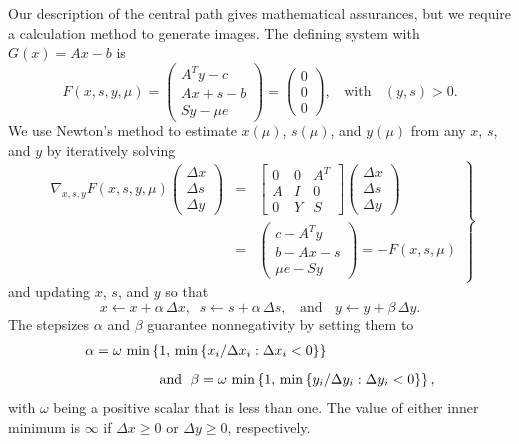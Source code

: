 \documentclass{article}
\begin{document}
Our description of the central path gives mathematical assurances, but 
we require a calculation method to generate images. 
The defining system with $G(x) = Ax - b$ is
\[
F(x,s,y,\mu) = \left(
        \begin{array}{c} 
            \displaystyle A^Ty - c \\[6pt]
            \displaystyle Ax + s - b \\[6pt]
            Sy - \mu e
        \end{array}
        \right)
    = \left( \begin{array}{c} 0 \\[6pt] 0 \\[6pt] 0 \end{array} \right),
\;\; \mbox{ with } \;\; (y,s) > 0.
\]
We use Newton's method to estimate $x(\mu)$, $s(\mu)$, and $y(\mu)$ 
from any $x$, $s$, and $y$ by iteratively solving
\begin{equation} \label{eq-stepSys}
\left.
\begin{array}{rcl}
\nabla_{x,s,y} F(x,s,y,\mu) 
    \left( \begin{array}{c} \Delta x \\ \Delta s \\ \Delta y
            \end{array} \right)
& = & \left[ \begin{array}{ccc}
    0 & 0 & A^T \\ A & I & 0 \\ 0 & Y & S \end{array} \right]
    \left( \begin{array}{c} \Delta x \\ \Delta s \\ \Delta y
            \end{array} \right)  \\[26pt]
& = &  \left(
        \begin{array}{c} 
            \displaystyle c - A^T y \\[2pt]
            \displaystyle b - Ax - s \\[2pt]
            \displaystyle \mu e - Sy
        \end{array}
        \right) = -F(x,s,\mu)
\end{array}
\right\}
\end{equation}
and updating $x$, $s$, and $y$ so that
\[
x \leftarrow x + \alpha \, \Delta x, \;\;
s \leftarrow s + \alpha \, \Delta s,
\;\; \mbox{ and } \;\;
y \leftarrow y + \beta \, \Delta y.
\]
The stepsizes $\alpha$ and $\beta$ guarantee nonnegativity by setting 
them to
\begin{eqnarray*}
\lefteqn{
\alpha = \omega \, \min \left\{ 1, \, \min \left\{ x_i / \Delta x_i : 
    \Delta x_i < 0 \right\} \right\} } \\[6pt]
& & \hspace*{40pt} \mbox{ and } \;
\beta = \omega \, \min \left\{ 1, \, \min \left\{ y_i / \Delta y_i : 
    \Delta y_i < 0 \right\} \right\},
\end{eqnarray*}
with $\omega$ being a positive scalar that is less than one.
The value of either inner minimum is $\infty$ if $\Delta x \ge 0$
or $\Delta y \ge 0$, respectively.
\end{document}
